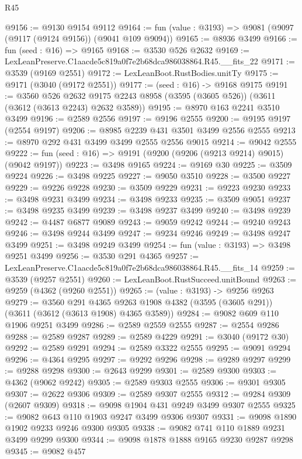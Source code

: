 \begin{lexlean}{R45}
\begin{coremodule}
@9156 := @9130 @9154 @9112
@9164 := fun (value : @3193) => @9081 (@9097 (@9117 (@9124 @9156)) (@9041 @109 @9094))
@9165 := @8936 @3499
@9166 := fun (seed : @16) => @9165
@9168 := @3530 @526 @2632
@9169 := LexLeanPreserve.C1aacde5c819a0f7e2b68dca986038864.R45.__fits_22
@9171 := @3539 (@9169 @2551)
@9172 := LexLeanBoot.RustBodies.unitTy
@9175 := @9171 (@3040 (@9172 @2551))
@9177 := (seed : @16) -> @9168 @9175
@9191 := @3560
    @526
    @2632
    @9175
    @2243
    @8958
    (@3595 (@3605 @526))
    (@3611 (@3612 (@3613 @2243) @2632 @3589))
@9195 := @8970 @163 @2241 @3510 @3499
@9196 := @2589 @2556
@9197 := @9196 @2555
@9200 := @9195 @9197 (@2554 @9197)
@9206 := @8985 @2239 @431 @3501 @3499 @2556 @2555
@9213 := @8970 @292 @431 @3499 @3499 @2555 @2556 @9015
@9214 := @9042 @2555
@9222 := fun (seed : @16) => @9191 (@9200 (@9206 (@9213 @9214) @9015) (@9042 @9197))
@9223 := @3498 @9165
@9224 := @9169 @30
@9225 := @3509 @9224
@9226 := @3498 @9225
@9227 := @9050 @3510
@9228 := @3500 @9227
@9229 := @9226 @9228
@9230 := @3509 @9229
@9231 := @9223 @9230
@9233 := @3498 @9231 @3499
@9234 := @3498 @9233
@9235 := @3509 @9051
@9237 := @3498 @9235 @3499
@9239 := @3498 @9237 @3499
@9240 := @3498 @9239
@9242 := @4487 @6877 @9089
@9243 := @9059 @9242
@9244 := @9240 @9243
@9246 := @3498 @9244 @3499
@9247 := @9234 @9246
@9249 := @3498 @9247 @3499
@9251 := @3498 @9249 @3499
@9254 := fun (value : @3193) => @3498 @9251 @3499
@9256 := @3530 @291 @4365
@9257 := LexLeanPreserve.C1aacde5c819a0f7e2b68dca986038864.R45.__fits_14
@9259 := @3539 (@9257 @2551)
@9260 := LexLeanBoot.RustSucceed.unitBound
@9263 := @9259 (@4362 (@9260 @2551))
@9265 := (value : @3193) -> @9256 @9263
@9279 := @3560
    @291
    @4365
    @9263
    @1908
    @4382
    (@3595 (@3605 @291))
    (@3611 (@3612 (@3613 @1908) @4365 @3589))
@9284 := @9082 @609 @110 @1906 @9251 @3499
@9286 := @2589 @2559 @2555
@9287 := @2554 @9286
@9288 := @2589 @9287
@9289 := @2589 @4229
@9291 := @3040 (@9172 @30)
@9292 := @2589 @9291
@9294 := @2589 @3322 @2555
@9295 := @9091 @9294
@9296 := @4364 @9295
@9297 := @9292 @9296
@9298 := @9289 @9297
@9299 := @9288 @9298
@9300 := @2643 @9299
@9301 := @2589 @9300
@9303 := @4362 (@9062 @9242)
@9305 := @2589 @9303 @2555
@9306 := @9301 @9305
@9307 := @2622 @9306
@9309 := @2589 @9307 @2555
@9312 := @9284 @9309 (@2607 @9309)
@9318 := @9098 @1904 @431 @9249 @3499 @9307 @2555
@9325 := @9082 @643 @110 @1903 @9247 @3499 @9306 @9307
@9331 := @9098 @1890 @1902 @9233 @9246 @9300 @9305
@9338 := @9082 @741 @110 @1889 @9231 @3499 @9299 @9300
@9344 := @9098 @1878 @1888 @9165 @9230 @9287 @9298
@9345 := @9082 @457

\end{coremodule}
\end{lexlean}

